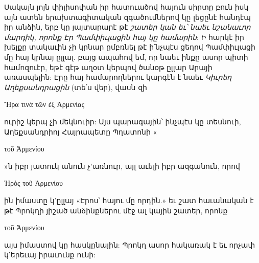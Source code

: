 \documentclass{article}
\begin{document}
{Սակայն յոյն փիլիսոփան իր հատուածով հայուն սիրտը բուն իսկ այն ատեն երախտագիտական զգածումներով կը լեցընէ հանդէպ իր անձին, երբ կը յայտարարէ թէ \emph{շատեր կան եւ՝ նաեւ նշանաւոր մարդիկ, որոնք Էր Պամփիւլացին հայ կը համարին}: Ի հարկէ իր խելքը տակաւին չի կրնար ըմբռնել թէ ի՛նչպէս ցեղով Պամփիւլացի մը հայ կրնայ ըլլալ. բայց ապահով եմ, որ նաեւ ինքը ասոր պիտի համոզուէր, եթէ գէթ աղօտ կերպով ծանօթ ըլլար Արայի առասպելին: Էրը հայ համարողներու կարգէն է նաեւ \emph{Կիւրեղ Աղեքսանդրացին} (տե՛ս վեր), վասն զի \begin{greek}Ἤρα τινὰ τῶν ἐξ Ἀρμενίας\end{greek} ուրիշ կերպ չի մեկնուիր: Այս պարագային՝ ինչպէս կը տեսնուի, Աղեքսանդրիոյ Հայրապետը Պղատոնի «\begin{greek}τοῦ Ἀρμενίου\end{greek}»ն իբր յատուկ անուն չ'առնուր, այլ աւելի իբր ազգանուն, որով \begin{greek}Ἠρὁς τοῦ Ἀρμενίου\end{greek}ին իմաստը կ'ըլլայ «Էրոս՝ հայու մը որդին.» եւ շատ հաւանական է թէ Պրոկղի յիշած անձինքներու մէջ ալ կային շատեր, որոնք \begin{greek}τοῦ Ἀρμενίου\end{greek} այս իմաստով կը հասկընային: Պրոկղ ասոր հակառակ է եւ որչափ կ'երեւայ իրաւունք ունի:

}
\end{document}
